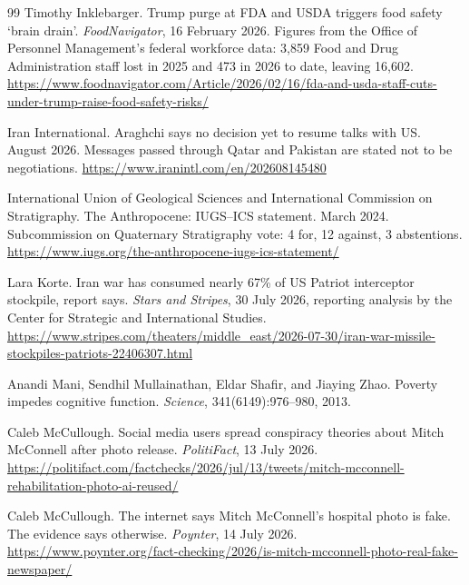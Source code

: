 \documentclass[11pt,a4paper]{article}
\theoremstyle{remark}
\begin{document}
\begin{thebibliography}{99}
Timothy Inklebarger.
\newblock Trump purge at FDA and USDA triggers food safety `brain drain'.
\newblock \emph{FoodNavigator}, 16 February 2026. Figures from the Office of Personnel Management's
federal workforce data: 3,859 Food and Drug Administration staff lost in 2025 and 473 in 2026 to date,
leaving 16,602.
\newblock \url{https://www.foodnavigator.com/Article/2026/02/16/fda-and-usda-staff-cuts-under-trump-raise-food-safety-risks/}

Iran International.
\newblock Araghchi says no decision yet to resume talks with US.
 August 2026. Messages passed through Qatar and Pakistan are stated not to be negotiations.
\newblock \url{https://www.iranintl.com/en/202608145480}

International Union of Geological Sciences and International Commission on Stratigraphy.
\newblock The Anthropocene: IUGS--ICS statement.
 March 2024. Subcommission on Quaternary Stratigraphy vote: 4 for, 12 against, 3
abstentions.
\newblock \url{https://www.iugs.org/the-anthropocene-iugs-ics-statement/}

Lara Korte.
\newblock Iran war has consumed nearly 67\% of US Patriot interceptor stockpile, report says.
\newblock \emph{Stars and Stripes}, 30 July 2026, reporting analysis by the Center for Strategic and International Studies.
\newblock \url{https://www.stripes.com/theaters/middle_east/2026-07-30/iran-war-missile-stockpiles-patriots-22406307.html}

Anandi Mani, Sendhil Mullainathan, Eldar Shafir, and Jiaying Zhao.
\newblock Poverty impedes cognitive function.
\newblock \emph{Science}, 341(6149):976--980, 2013.

Caleb McCullough.
\newblock Social media users spread conspiracy theories about Mitch McConnell after photo release.
\newblock \emph{PolitiFact}, 13 July 2026.
\newblock \url{https://politifact.com/factchecks/2026/jul/13/tweets/mitch-mcconnell-rehabilitation-photo-ai-reused/}

Caleb McCullough.
\newblock The internet says Mitch McConnell's hospital photo is fake. The evidence says otherwise.
\newblock \emph{Poynter}, 14 July 2026.
\newblock \url{https://www.poynter.org/fact-checking/2026/is-mitch-mcconnell-photo-real-fake-newspaper/}


\end{thebibliography}
\end{document}
